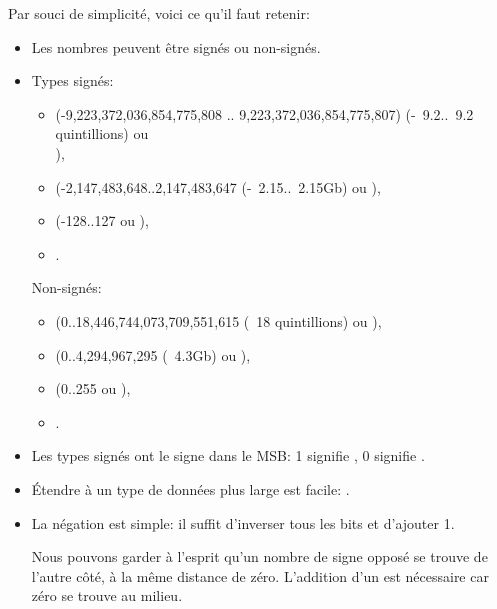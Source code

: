 Par souci de simplicité, voici ce qu'il faut retenir:

\begin{itemize}
\item Les nombres peuvent être signés ou non-signés.

\item Types \CCpp signés:

  \begin{itemize}
    \item {} (-9,223,372,036,854,775,808 .. 9,223,372,036,854,775,807)
	  (-~9.2..~9.2 quintillions) ou \\
                ),
    \item \Tint (-2,147,483,648..2,147,483,647 (-~2.15..~2.15Gb) ou ),
    \item \Tchar (-128..127 ou ),
    \item {}.
   \end{itemize}

	Non-signés:
  \begin{itemize}
	  \item {} (0..18,446,744,073,709,551,615 
		  (~18 quintillions) ou ),
   \item {} (0..4,294,967,295 (~4.3Gb) ou ),
   \item {} (0..255 ou ),
   \item {}.
  \end{itemize}

\item Les types signés ont le signe dans le \ac{MSB}: 1 signifie , 0 signifie .

\item Étendre à un type de données plus large est facile:
.

\label{sec:signednumbers:negation}
\item La négation est simple: il suffit d'inverser tous les bits et d'ajouter 1.

Nous pouvons garder à l'esprit qu'un nombre de signe opposé se trouve de l'autre côté,
à la même distance de zéro.
L'addition d'un est nécessaire car zéro se trouve au milieu.


\end{itemize}
